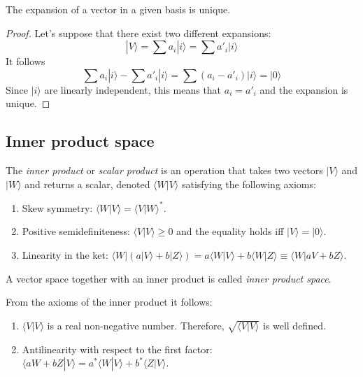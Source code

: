 \documentclass[11pt,fleqn]{book} %
\newcommand{\bra}[1]{\langle #1|}
\newcommand{\ket}[1]{| #1\rangle}
\newcommand{\scalar}[2]{\langle #1| #2\rangle}
\begin{document}
\begin{theorem}
    The expansion of a vector in a given basis is unique.
\end{theorem}
\begin{proof}
    Let's suppose that there exist two different expansions:
    \begin{equation*}
        \ket{V}=\sum a_i\ket{i} = \sum a'_i\ket{i}
    \end{equation*}
    It follows
    \begin{equation*}
        \sum a_i\ket{i} - \sum a'_i\ket{i} =  \sum (a_i-a'_i)\ket{i} = \ket{0}
    \end{equation*}
    Since $\ket{i}$ are linearly independent, this means that $a_i=a'_i$ and the expansion is unique.
\end{proof}

\subsection{Inner product space}
\begin{definition}
    The \textit{inner product} or \textit{scalar product} is an operation that takes two vectors $\ket{V}$ and $\ket{W}$ and
    returns a scalar, denoted $\scalar{W}{V}$ satisfying the following axioms:
    \begin{enumerate}
        \item Skew symmetry: $\scalar{W}{V}=\scalar{V}{W}^*$.
        \item Positive semidefiniteness: $\scalar{V}{V}\geq 0$ and the equality holds iff $\ket{V}=\ket{0}$.
        \item Linearity in the ket: $\bra{W}(a\ket{V}+b\ket{Z})=a\scalar{W}{V}+b\scalar{W}{Z}\equiv\scalar{W}{aV+bZ}$.
    \end{enumerate}
    A vector space together with an inner product is called \textit{inner product space}.
\end{definition}

\begin{remark}
    From the axioms of the inner product it follows:
    \begin{enumerate}
        \item $\scalar{V}{V}$ is a real non-negative number. Therefore, $\sqrt{\scalar{V}{V}}$ is well defined.
        \item Antilinearity with respect to the first factor: $\scalar{aW+bZ}{V}=a^*\scalar{W}{V}+b^*\scalar{Z}{V}$. 
    \end{enumerate}
\end{remark}
\end{document}
